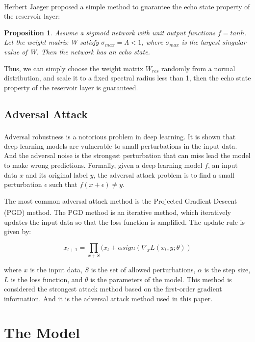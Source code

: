 \documentclass{article}
\newcommand{\upcite}[1]{\textsuperscript{\cite{#1}}} %
\newtheorem{proposition}[theorem]{Proposition}
\begin{document}
Herbert Jaeger\upcite{ESN} proposed a simple method to guarantee the echo state property of the reservoir layer:

\begin{proposition}
    Assume a sigmoid network with unit output functions $f = tanh$. 
    Let the weight matrix W satisfy $\sigma_{max} = \Lambda < 1$, 
    where $\sigma_{max}$ is the
    largest singular value of W. Then the network has an echo state.
\end{proposition}

Thus, we can simply choose the weight matrix $W_{res}$ randomly from a normal distribution, and scale it to a fixed spectral radius less than 1,
then the echo state property of the reservoir layer is guaranteed.


\subsection{Adversal Attack}

Adversal robustness\upcite{Adversarial} is a notorious problem in deep learning. It is shown that deep learning models are vulnerable to small perturbations
in the input data. And the adversal noise is the strongest perturbation that can miss lead the model to make wrong predictions.
Formally, given a deep learning model $f$, an input data $x$ and its original label $y$, 
the adversal attack problem is to find a small perturbation $\epsilon$ such that $f(x + \epsilon) \neq y$.

The most common adversal attack method is the Projected Gradient Descent (PGD)\upcite{PGD} method. The PGD method is an iterative method, which
iteratively updates the input data so that the loss function is amplified. The update rule is given by:

\begin{equation}
	x_{t+1} = \prod_{x+S}(x_t+\alpha sign (\nabla_x L(x_t,y;\theta))
\end{equation}

where $x$ is the input data, $S$ is the set of allowed perturbations, $\alpha$ is the step size, 
$L$ is the loss function, and $\theta$ is the parameters of the model. This method is
considered the strongest attack method based on the first-order gradient information.
And it is the adversal attack method used in this paper.


\section{The Model}
\end{document}
